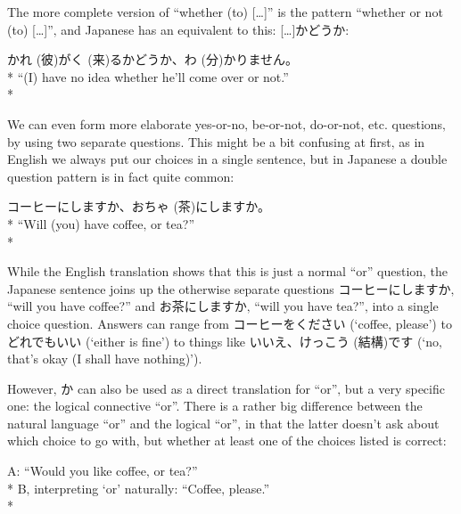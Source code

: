 \documentclass[11pt, b5paper, twoside, openright, onecolumn]{book}
\makeatletter
\newcommand*{\rubystack}[2]{{\relscale{0.5}%
  \begin{tabular}[b]{@{}c@{}}%
    {#1}\\%
   {\textscale{2}{#2}}%
  \end{tabular}}%
}
\DeclareRobustCommand*{\ruby}[2]{%
  \mbox{%
    \setlength{\parskip}{0ex}%
    \BeginAccSupp{method=pdfstringdef,ActualText={#1}}%
      \rubystack{\phantom{#2}}{#1}%
      \llap{%
        \rubystack{#2}{\phantom{#1}}%
      }%
    \EndAccSupp{}%
  }%
}
\renewcommand*{\ruby}[2]{#2 (#1)}%
\newenvironment{exampleblock}{
\setlength{\parindent}{0.6in}
\begin{minipage}[t]{\dimexpr\textwidth-\parindent}}
{\end{minipage}}
\makeatother
\begin{document}
The more complete version of “whether (to) […]” is the pattern “whether or not (to) […]”‚ and Japanese has an equivalent to this: […]かどうか:

\vspace{0.4cm}
\begin{exampleblock}
\ruby{彼}{かれ}が\ruby{来}{く}るかどうか、\ruby{分}{わ}かりません。 \\* 
“(I) have no idea whether he’ll come over or not.” \\* 
\end{exampleblock}
\vspace{0.2cm}

We can even form more elaborate yes-or-no‚ be-or-not‚ do-or-not‚ etc. questions‚ by using two separate questions. This might be a bit confusing at first‚ as in English we always put our choices in a single sentence‚ but in Japanese a double question pattern is in fact quite common:

\vspace{0.4cm}
\begin{exampleblock}
コーヒーにしますか、お\ruby{茶}{ちゃ}にしますか。 \\* 
“Will (you) have coffee‚ or tea?” \\* 
\end{exampleblock}
\vspace{0.2cm}

While the English translation shows that this is just a normal “or” question‚ the Japanese sentence joins up the otherwise separate questions コーヒーにしますか‚ “will you have coffee?” and お茶にしますか‚ “will you have tea?”‚ into a single choice question. Answers can range from コーヒーをください (‘coffee‚ please’) to どれでもいい (‘either is fine’) to things like いいえ、\ruby{結構}{けっこう}です (‘no‚ that’s okay (I shall have nothing)’).

However‚ か can also be used as a direct translation for “or”‚ but a very specific one: the logical connective “or”. There is a rather big difference between the natural language “or” and the logical “or”‚ in that the latter doesn’t ask about which choice to go with‚ but whether at least one of the choices listed is correct:

\vspace{0.4cm}
\begin{exampleblock}
A: “Would you like coffee‚ or tea?” \\* 
B‚ interpreting ‘or’ naturally: “Coffee‚ please.” \\* 
\end{exampleblock}
\vspace{0.2cm}
\end{document}

